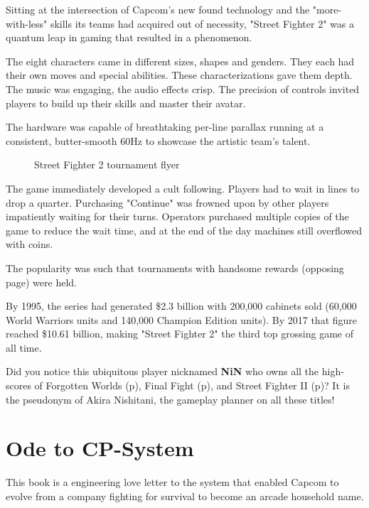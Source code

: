 Sitting at the intersection of Capcom's new found technology and the "more-with-less" skills its teams had acquired out of necessity, "Street Fighter 2" was a quantum leap in gaming that resulted in a phenomenon.  

The eight characters came in different sizes, shapes and genders. They each had their own moves and special abilities. These characterizations gave them depth. The music was engaging, the audio effects crisp. The precision of controls invited players to build up their skills and master their avatar. 

The hardware was capable of breathtaking per-line parallax running at a consistent, butter-smooth 60Hz to showcase the artistic team's talent. 


\begin{figure}[H]
\caption*{Street Fighter 2 tournament flyer}
\end{figure}

The game immediately developed a cult following. Players had to wait in lines to drop a quarter. Purchasing "Continue" was frowned upon by other players impatiently waiting for their turns. Operators purchased multiple copies of the game to reduce the wait time, and at the end of the day machines still overflowed with coins\cite{sf2_oral_history}.

The popularity was such that tournaments with handsome rewards (opposing page) were held. 

By 1995, the series had generated \$2.3 billion with 200,000 cabinets sold\cite{usgamer20160101} (60,000 World Warriors units and 140,000 Champion Edition units). By 2017 that figure reached \$10.61 billion\cite{gamerevolution20140126}, making "Street Fighter 2" the third top grossing game of all time.

\begin{trivia}
Did you notice this ubiquitous player nicknamed \textbf{NiN} who owns all the high-scores of Forgotten Worlds (p\pageref{nin_fw}), Final Fight (p\pageref{nin_ff}), and Street Fighter II (p\pageref{nin_sf2})? It is the pseudonym of Akira Nishitani, the gameplay planner on all these titles!
\end{trivia}

\section{Ode to CP-System}

This book is a engineering love letter to the system that enabled Capcom to evolve from a company fighting for survival to become an arcade household name.

